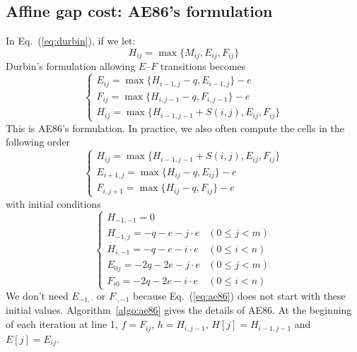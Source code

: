 \documentclass{bioinfo}
\begin{document}
\subsection{Affine gap cost: AE86's formulation}

In Eq.~(\ref{eq:durbin}), if we let:
\[H_{ij}=\max\{M_{ij},E_{ij},F_{ij}\}\]
Durbin's formulation allowing $E$--$F$ transitions becomes
\begin{equation*}
\left\{\begin{array}{l}
E_{ij}=\max\{H_{i-1,j}-q, E_{i-1,j}\} - e \\
F_{ij}=\max\{H_{i,j-1}-q, F_{i,j-1}\} - e \\
H_{ij}=\max\{H_{i-1,j-1}+S(i,j), E_{ij}, F_{ij}\}
\end{array}\right.
\end{equation*}
This is AE86's formulation. In practice, we also often compute the cells in the
following order
\begin{equation}\label{eq:ae86}
\left\{\begin{array}{l}
H_{ij}=\max\{H_{i-1,j-1}+S(i,j), E_{ij}, F_{ij}\}\\
E_{i+1,j}=\max\{H_{ij}-q, E_{ij}\} - e \\
F_{i,j+1}=\max\{H_{ij}-q, F_{ij}\} - e
\end{array}\right.
\end{equation}
with initial conditions
\begin{equation}
\left\{\begin{array}{ll}
H_{-1,-1}=0\\
H_{-1,j}=-q-e-j\cdot e & (0\le j<m)\\
H_{i,-1}=-q-e-i\cdot e & (0\le i<n)\\
E_{0j}=-2q-2e-j\cdot e & (0\le j<m)\\
F_{i0}=-2q-2e-i\cdot e & (0\le i<n)
\end{array}\right.
\end{equation}
We don't need $E_{-1,\cdot}$ or $F_{\cdot,-1}$ because Eq.~(\ref{eq:ae86})
does not start with these initial values. Algorithm~\ref{algo:ae86} gives
the details of AE86. At the beginning of each iteration at line 1, $f=F_{ij}$,
$h=H_{i,j-1}$, $H[j]=H_{i-1,j-1}$ and $E[j]=E_{ij}$.
\end{document}
